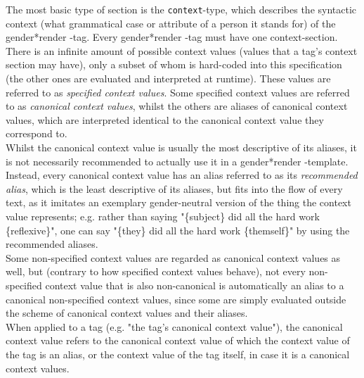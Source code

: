 \documentclass{article}
\newcommand{\GenderRender}{
    gender*render
}
\begin{document}
    The most basic type of section is the \texttt{context}-type, which describes the syntactic context (what grammatical case or attribute of a person it stands for) of the \GenderRender-tag.
    Every \GenderRender-tag must have one context-section.\\

    There is an infinite amount of possible context values (values that a tag's context section may have), only a subset of whom is hard-coded into this specification (the other ones are evaluated and interpreted at runtime).
    These values are referred to as \emph{specified context values}.
    Some specified context values are referred to as \emph{canonical context values}, whilst the others are aliases of canonical context values, which are interpreted identical to the canonical context value they correspond to.\\
    Whilst the canonical context value is usually the most descriptive of its aliases, it is not necessarily recommended to actually use it in a \GenderRender-template.
    Instead, every canonical context value has an alias referred to as its \emph{recommended alias}, which is the least descriptive of its aliases, but fits into the flow of every text, as it imitates an exemplary gender-neutral version of the thing the context value represents;
    e.g. rather than saying "\{subject\} did all the hard work \{reflexive\}", one can say "\{they\} did all the hard work \{themself\}" by using the recommended aliases.\\
    Some non-specified context values are regarded as canonical context values as well, but (contrary to how specified context values behave), not every non-specified context value that is also non-canonical is automatically an alias to a canonical non-specified context values, since
    some are simply evaluated outside the scheme of canonical context values and their aliases.\\

    When applied to a tag (e.g. "the tag's canonical context value"), the canonical context value refers to the canonical context value of which the context value of the tag is an alias, or the context value of the tag itself, in case it is a canonical context values.\\
\end{document}
